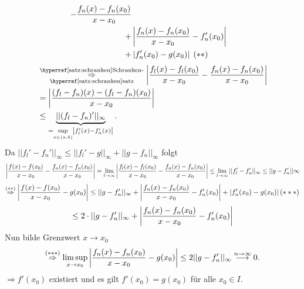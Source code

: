 \documentclass[../ana1.tex]{subfiles}
\begin{document}
\begin{bew}
\begin{align*}
{        - \frac{f_n(x)-f_n(x_0)}{x-x_0} } \\
        + &\left| \frac{f_n(x)-f_n(x_0)}{x-x_0} 
        - f_n'(x_0) \right| \\
        + &\left| f_n'(x_0)
        - g(x_0) \right| \; (**)
    \end{align*}
    \begin{align*}
        &\overunderref{satz:schranken}{Schranken-}{satz}{\Rightarrow}
        \abs{\frac{f_l(x)-f_l(x_0)}{x-x_0}-\frac{f_n(x)-f_n(x_0)}{x-x_0}} \\
        &= \abs{\frac{(f_l-f_n)(x)-(f_l - f_n)(x_0)}{x-x_0}} \\
        &\leq \underbrace{||(f_l-f_n)'||_\infty}_
        {=\underset{x \in (a,b)}{\sup} \abs{f_l'(x)-f_n'(x)}}.
    \end{align*}
    Da \( ||f_l' - f_n'||_\infty \leq ||f_l' - g||_\infty 
    + ||g - f_n||_\infty \) folgt 
    \[ \left| \frac{ f(x) - f(x_0) }{ x-x_0 } 
    - \frac{ f_n(x) - f_n(x_0) }{ x-x_0 } \right| 
    = \lim\limits_{l\rightarrow\infty} \left| \frac{ f_l(x) - f_l(x_0) }{ x-x_0 } 
    - \frac{ f_n(x) - f_n(x_0) }{ x-x_0 } \right| 
    \leq \lim\limits_{l\rightarrow\infty} ||f_l' - f_n'||_\infty \leq ||g-f_n'||\infty \]
    \[ \overset{(**)}{\Rightarrow} \left| \frac{ f(x) - f(x_0) }{ x-x_0 } 
    - g(x_0) \right| 
    \leq ||g - f_n' ||_\infty 
    + \left| \frac{ f_n(x) - f_n(x_0) }{ x-x_0 } - f_n'(x_0) \right| 
    + \left| f_n'(x_0) - g(x_0) \right| (***) \]
    \[ \leq 2\cdot ||g - f_n' ||_\infty 
    + \left| \frac{ f_n(x) - f_n(x_0) }{ x-x_0 } - f_n'(x_0) \right|  \]
    Nun bilde Grenzwert \( x \rightarrow x_0 \)
    \[ \overset{(***)}{\Rightarrow} 
    \limsup\limits_{x\rightarrow x_0} 
    \left| \frac{ f_n(x) - f_n(x_0) }{ x-x_0 } - g(x_0) \right| 
    \leq 2 ||g - f_n'||_\infty 
    \overset{n\rightarrow \infty}{\longrightarrow} 0. \]
    \( \Rightarrow f'(x_0) \) existiert und es gilt 
    \( f'(x_0) = g(x_0) \) für alle \( x_0 \in I \).
\end{bew}
\end{document}
